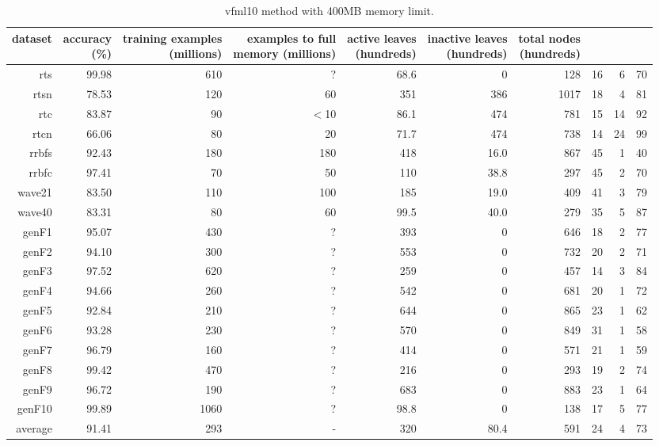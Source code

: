 \clearpage
\begin{table}
\caption{{\sc vfml10} method with 400MB memory limit.}
\label{tab:vfml10-400MB}
\centering
\begin{tabular}{|r|r|r|r|r|r|r|r|r|r|}
\hline
dataset	&
\rotatebox{90}{\parbox{9em}{accuracy\\(\%)}} &
\rotatebox{90}{\parbox{9em}{training examples\\(millions)}} &
\rotatebox{90}{\parbox{9em}{examples to full\\memory (millions)}} &
\rotatebox{90}{\parbox{9em}{active leaves\\(hundreds)}} &
\rotatebox{90}{\parbox{9em}{inactive leaves\\(hundreds)}} &
\rotatebox{90}{\parbox{9em}{total nodes\\(hundreds)}} &
\rotatebox{90}{\parbox{9em}{tree depth}}	&
\rotatebox{90}{\parbox{9em}{training speed (\%)}} &
\rotatebox{90}{\parbox{9em}{prediction speed (\%)}} \\
\hline
{\sc rts} & 99.98 & 610 & ? & 68.6 & 0 & 128 & 16 & 6 & 70 \\
{\sc rtsn} & 78.53 & 120 & 60 & 351 & 386 & 1017 & 18 & 4 & 81 \\
{\sc rtc} & 83.87 & 90 & $<$10 & 86.1 & 474 & 781 & 15 & 14 & 92 \\
{\sc rtcn} & 66.06 & 80 & 20 & 71.7 & 474 & 738 & 14 & 24 & 99 \\
{\sc rrbfs} & 92.43 & 180 & 180 & 418 & 16.0 & 867 & 45 & 1 & 40 \\
{\sc rrbfc} & 97.41 & 70 & 50 & 110 & 38.8 & 297 & 45 & 2 & 70 \\
{\sc wave21} & 83.50 & 110 & 100 & 185 & 19.0 & 409 & 41 & 3 & 79 \\
{\sc wave40} & 83.31 & 80 & 60 & 99.5 & 40.0 & 279 & 35 & 5 & 87 \\
{\sc genF1} & 95.07 & 430 & ? & 393 & 0 & 646 & 18 & 2 & 77 \\
{\sc genF2} & 94.10 & 300 & ? & 553 & 0 & 732 & 20 & 2 & 71 \\
{\sc genF3} & 97.52 & 620 & ? & 259 & 0 & 457 & 14 & 3 & 84 \\
{\sc genF4} & 94.66 & 260 & ? & 542 & 0 & 681 & 20 & 1 & 72 \\
{\sc genF5} & 92.84 & 210 & ? & 644 & 0 & 865 & 23 & 1 & 62 \\
{\sc genF6} & 93.28 & 230 & ? & 570 & 0 & 849 & 31 & 1 & 58 \\
{\sc genF7} & 96.79 & 160 & ? & 414 & 0 & 571 & 21 & 1 & 59 \\
{\sc genF8} & 99.42 & 470 & ? & 216 & 0 & 293 & 19 & 2 & 74 \\
{\sc genF9} & 96.72 & 190 & ? & 683 & 0 & 883 & 23 & 1 & 64 \\
{\sc genF10} & 99.89 & 1060 & ? & 98.8 & 0 & 138 & 17 & 5 & 77 \\
\hline
average & 91.41 & 293 &  -  & 320 & 80.4 & 591 & 24 & 4 & 73 \\
\hline
\end{tabular}
\end{table}
